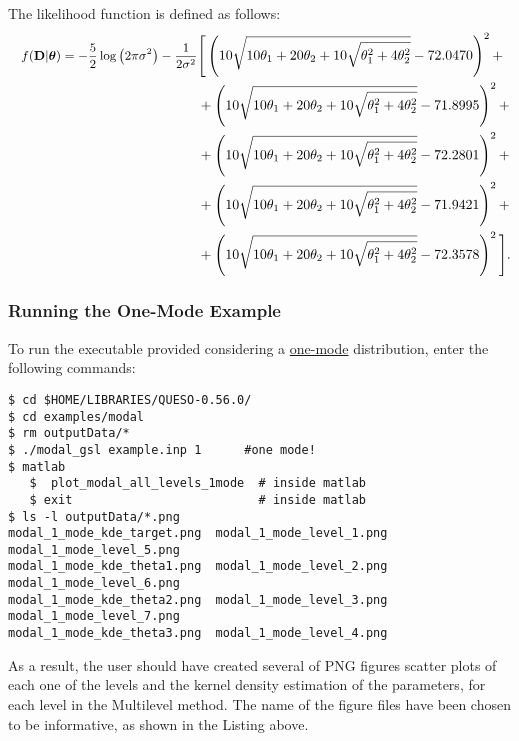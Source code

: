 The likelihood function is defined as follows:
\begin{equation}
\begin{split} \small
\quad f({\bf D}|\mbox{\boldmath$ \theta $})= -\dfrac{5}{2} \log\left(2 \pi \sigma^2\right)-\dfrac{1}{2\sigma^2} &\Bigg[
 \left(10 \sqrt{10 \theta_1+20 \theta_2+10 \sqrt{\theta_1^2+4 \theta_2^2}}-72.0470\right)^2 +\\
&+\left(10 \sqrt{10 \theta_1+20 \theta_2+10 \sqrt{\theta_1^2+4 \theta_2^2}}-71.8995\right)^2 +\\
&+\left(10 \sqrt{10 \theta_1+20 \theta_2+10 \sqrt{\theta_1^2+4 \theta_2^2}}-72.2801\right)^2 +\\
&+\left(10 \sqrt{10 \theta_1+20 \theta_2+10 \sqrt{\theta_1^2+4 \theta_2^2}}-71.9421\right)^2 +\\
&+\left(10 \sqrt{10 \theta_1+20 \theta_2+10 \sqrt{\theta_1^2+4 \theta_2^2}}-72.3578\right)^2 \Bigg].
\end{split}
\end{equation}

\subsubsection{Running the One-Mode Example}
 
To run the executable provided considering a \underline{one-mode} distribution, enter the following commands:
\begin{lstlisting}[label={},caption={Running the example with a one-mode distribution.}]
$ cd $HOME/LIBRARIES/QUESO-0.56.0/
$ cd examples/modal
$ rm outputData/*
$ ./modal_gsl example.inp 1      #one mode!
$ matlab
   $  plot_modal_all_levels_1mode  # inside matlab
   $ exit                          # inside matlab
$ ls -l outputData/*.png
modal_1_mode_kde_target.png  modal_1_mode_level_1.png  modal_1_mode_level_5.png
modal_1_mode_kde_theta1.png  modal_1_mode_level_2.png  modal_1_mode_level_6.png
modal_1_mode_kde_theta2.png  modal_1_mode_level_3.png  modal_1_mode_level_7.png
modal_1_mode_kde_theta3.png  modal_1_mode_level_4.png
\end{lstlisting}

As a result, the user should have created several of PNG figures scatter plots of each one of the levels and the kernel density estimation of the parameters, for each level in the Multilevel method. The name of the figure files have been chosen to be informative, as shown in the Listing above. 



